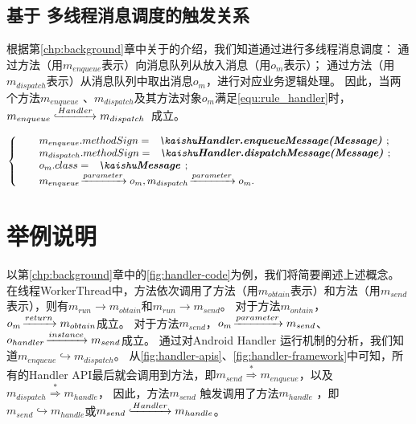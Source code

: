 \subsection{基于 多线程消息调度的触发关系}

根据第\ref{chp:background}章中关于的介绍，我们知道通过进行多线程消息调度：
通过方法（用$m_{enqueue}$表示）向消息队列从放入消息（用$o_m$表示）；
通过方法（用$m_{dispatch}$表示）从消息队列中取出消息$o_m$，进行对应业务逻辑处理。
因此，当两个方法$m_{enqueue}$ 、$m_{dispatch}$及其方法对象$o_{m}$满足\autoref{equ:rule_handler}时，$m_{enqueue} \lhook\joinrel\xrightarrow{Handler}  m_{dispatch}  $ 成立。

\begin{equation}
\left\{  
\begin{array}{ll}
&m_{enqueue}.methodSign = \text{\codeInEqu{Handler.enqueueMessage(Message)}};\\
&m_{dispatch}.methodSign = \text{\codeInEqu{Handler.dispatchMessage(Message)}};\\
& o_m.class =   \text{\codeInEqu{Message}}; \\
 &m_{enqueue}\joinrel\xrightarrow{parameter} o_m  , m_{dispatch}\joinrel\xrightarrow{parameter} o_m.
\end{array}  
\right.  
\label{equ:rule_handler} 
\end{equation}


\section{举例说明}



以第\ref{chp:background}章中的\autoref{fig:handler-code}为例，我们将简要阐述上述概念。
在线程WorkerThread中，方法依次调用了方法（用$m_{obtain}$表示）和方法（用$m_{send}$表示），则有$m_{run} \to m_{obtain} $和$m_{run} \to m_{send}$。
对于方法$m_{ontain}$，$o_{m} \joinrel\xrightarrow{return} m_{obtain} $成立。
对于方法$m_{send}$，$o_{m} \joinrel\xrightarrow{parameter} m_{send} $、$o_{handler} \joinrel\xrightarrow{instance} m_{send} $成立。
通过对Android Handler 运行机制的分析，我们知道$m_{enqueue} \hookrightarrow m_{dispatch}$。
从\autoref{fig:handler-apis}、\autoref{fig:handler-framework}中可知，所有的Handler API最后就会调用到方法，即$m_{send} \stackrel{\ast	}{\Rightarrow} m_{enqueue} $，以及$m_{dispatch} \stackrel{\ast}{\Rightarrow}  m_{handle}$，
因此，方法$m_{send}$ 触发调用了方法$m_{handle}$ ，即$m_{send} \hookrightarrow m_{handle}$或$m_{send} \lhook\joinrel\xrightarrow{Handler}  m_{handle} $。

